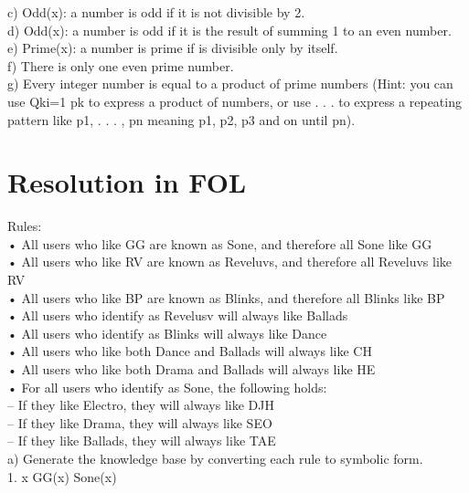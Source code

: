\documentclass{article}
\begin{document}
c) Odd(x): a number is odd if it is not divisible by 2.\\

d) Odd(x): a number is odd if it is the result of summing 1 to an even number.\\

e) Prime(x): a number is prime if is divisible only by itself.\\

f) There is only one even prime number.\\

g) Every integer number is equal to a product of prime numbers (Hint: you can use Qki=1 pk to express a product of numbers, or use . . . to express a repeating pattern like p1, . . . , pn meaning p1, p2, p3 and on until pn).\\

\section{Resolution in FOL}

Rules: \\
• All users who like GG are known as Sone, and therefore all Sone like GG\\
• All users who like RV are known as Reveluvs, and therefore all Reveluvs like RV\\
• All users who like BP are known as Blinks, and therefore all Blinks like BP\\
• All users who identify as Revelusv will always like Ballads\\
• All users who identify as Blinks will always like Dance\\
• All users who like both Dance and Ballads will always like CH\\
• All users who like both Drama and Ballads will always like HE\\
• For all users who identify as Sone, the following holds:\\
– If they like Electro, they will always like DJH\\
– If they like Drama, they will always like SEO\\
– If they like Ballads, they will always like TAE\\

a) Generate the knowledge base by converting each rule to symbolic form.\\

1. \forall x \: GG(x) \Leftrightarrow Sone(x)\\
\end{document}
